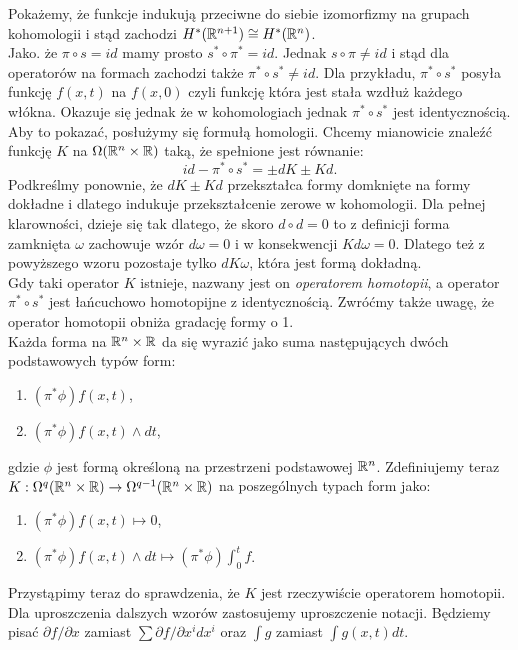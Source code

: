 \documentclass[licencjacka]{pracamgr}
\theoremstyle{definition}
\theoremstyle{definition}
\theoremstyle{plain}
\theoremstyle{plain}
\theoremstyle{plain}
\theoremstyle{plain}
\def\R{\ensuremath\mathbb{R}}
\begin{document}
Pokażemy, że funkcje indukują przeciwne do siebie izomorfizmy na
grupach kohomologii i stąd zachodzi $H^\ast(\R^{n+1}) \cong H^\ast(\R^{n})$. \\

Jako. że $\pi \circ s = id$  mamy prosto $s^\ast \circ \pi^\ast = id$. Jednak
$s \circ \pi \neq id$ i stąd dla operatorów
na formach zachodzi także $\pi^\ast \circ s^\ast \neq id$. Dla przykładu,
$\pi^\ast \circ s^\ast$ posyła funkcję $f(x, t)$ na $f(x, 0)$ czyli 
funkcję która jest stała wzdłuż każdego włókna. Okazuje się jednak
że w kohomologiach jednak $\pi^\ast \circ s^\ast$ jest identycznością.
Aby to pokazać, posłużymy się formułą homologii. Chcemy mianowicie
znaleźć funkcję $K$ na $\Omega(\R^n \times \R)$ taką, że spełnione jest
równanie:
\[
    id- \pi^\ast \circ s^\ast = \pm dK \pm Kd.
\]
Podkreślmy ponownie, że $dK \pm Kd$ przekształca formy domknięte
na formy dokładne i dlatego indukuje przekształcenie zerowe w kohomologii. 
Dla pełnej klarowności, dzieje się tak dlatego, że skoro $d \circ d = 0$
to z definicji forma zamknięta $\omega$ zachowuje wzór $d \omega = 0$ i
w konsekwencji $K d \omega = 0$. Dlatego też z powyższego wzoru pozostaje
tylko $d K \omega$, która jest formą dokładną. \\

Gdy taki operator $K$ istnieje, nazwany jest on \emph{operatorem homotopii},
a operator $\pi^\ast \circ s^\ast$ jest łańcuchowo homotopijne z identycznością.
Zwróćmy także uwagę, że operator homotopii obniża gradację formy o 1. \\

Każda forma na $\R^n \times \R$ da się wyrazić jako suma następujących
dwóch podstawowych typów form:

\begin{enumerate}
    \item $(\pi^\ast \phi)f(x,t)$, 
    \item $(\pi^\ast \phi)f(x,t) \wedge dt$,
\end{enumerate}

gdzie $\phi$ jest formą określoną na przestrzeni podstawowej $\R^n$.
Zdefiniujemy teraz
$K: \Omega^{q} (\R^n \times \R) \rightarrow \Omega^{q-1} (\R^n \times \R)$ 
na poszególnych typach form jako:
\begin{enumerate}
    \item $(\pi^\ast \phi)f(x,t) \mapsto 0$,
    \item $(\pi^\ast \phi)f(x,t) \wedge dt \mapsto (\pi^\ast \phi) \int_0^t f$.
\end{enumerate}
Przystąpimy teraz do sprawdzenia, że $K$ jest rzeczywiście operatorem homotopii.
Dla uproszczenia dalszych wzorów zastosujemy uproszczenie notacji. Będziemy
pisać $\partial f / \partial x$ zamiast $\sum \partial f / \partial x^i dx^i$
oraz $\int g$ zamiast $\int g(x, t) dt$. \\
\end{document}
